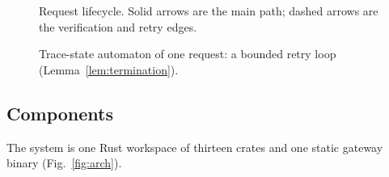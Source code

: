 \begin{figure}[t]
\centering

\caption{Request lifecycle. Solid arrows are the main path; dashed arrows are
the verification and retry edges.}
\label{fig:flow}
\end{figure}

\begin{figure}[t]
\centering

\caption{Trace-state automaton of one request: a bounded retry loop
(Lemma~\ref{lem:termination}).}
\label{fig:nafs-automaton}
\end{figure}

\subsection{Components}
\label{sec:components}
The system is one Rust workspace of thirteen crates and one static gateway
binary (Fig.~\ref{fig:arch}).
